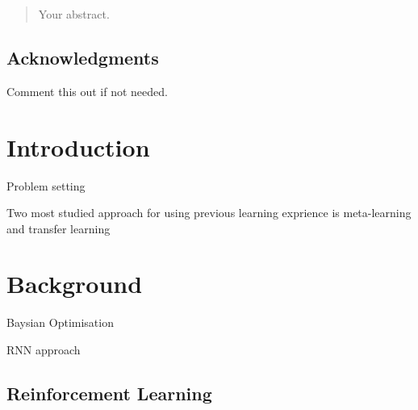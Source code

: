 \documentclass[12pt,twoside]{report}
\date{September 2015}
\begin{document}



\clearpage{\pagestyle{empty}\cleardoublepage}
\setcounter{page}{1}
\pagestyle{fancy}

\begin{abstract}
Your abstract.
\end{abstract}

\cleardoublepage
\section*{Acknowledgments}
Comment this out if not needed.

\clearpage{\pagestyle{empty}\cleardoublepage}

\tableofcontents


\clearpage{\pagestyle{empty}\cleardoublepage}
\setcounter{page}{1}
\fancyhead[LE,RO]{\slshape \rightmark}
\fancyhead[LO,RE]{\slshape \leftmark}

\chapter{Introduction}

Problem setting

Two most studied approach for using previous learning exprience is meta-learning and transfer learning

\chapter{Background}

Baysian Optimisation

RNN approach


\section{Reinforcement Learning}
\end{document}
